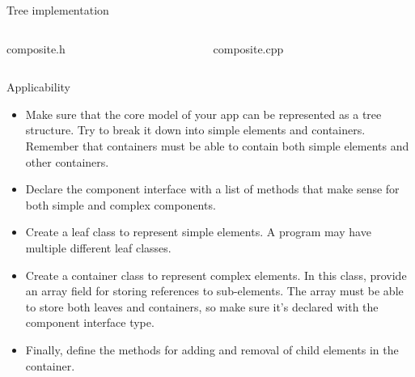 \documentclass[13pt]{beamer}
\begin{document}
\begin{frame}{Tree implementation}
\begin{columns}[T]
\begin{column}{.45\textwidth}
\lstset{basicstyle=\tiny,style=myCustomCppStyle}
composite.h

\end{column}

\begin{column}{.45\textwidth}
\lstset{basicstyle=\tiny,style=myCustomCppStyle}
composite.cpp

\end{column}
\end{columns}
\end{frame}

\begin{frame}{Applicability}
	\begin{itemize}
		\item Make sure that the core model of your app can be represented as a tree structure. Try to break it down into simple elements and containers. Remember that containers must be able to contain both simple elements and other containers.
		\item Declare the component interface with a list of methods that make sense for both simple and complex components.
		\item Create a leaf class to represent simple elements. A program may have multiple different leaf classes.
		\item Create a container class to represent complex elements. In this class, provide an array field for storing references to sub-elements. The array must be able to store both leaves and containers, so make sure it’s declared with the component interface type.
		\item Finally, define the methods for adding and removal of child elements in the container.
	\end{itemize}
\end{frame}
\end{document}
